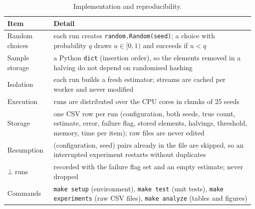 \documentclass[11pt]{article}
\begin{document}
\begin{table}[htbp]
\centering\small
\caption{Implementation and reproducibility.}\label{tab:impl}
\begin{tabularx}{\linewidth}{@{}p{2.8cm}L@{}}
\toprule
Item & Detail \\
\midrule
Random choices & each run creates \texttt{random.Random(seed)}; a choice with
  probability $q$ draws $u \in [0,1)$ and succeeds if $u < q$ \\
Sample storage & a Python \texttt{dict} (insertion order), so the elements
  removed in a halving do not depend on randomised hashing \\
Isolation & each run builds a fresh estimator; streams are cached per worker
  and never modified \\
Execution & runs are distributed over the CPU cores in chunks of 25 seeds \\
Storage & one CSV row per run (configuration, both seeds, true count,
  estimate, error, failure flag, stored elements, halvings, threshold, memory,
  time per item); raw files are never edited \\
Resumption & (configuration, seed) pairs already in the file are skipped, so
  an interrupted experiment restarts without duplicates \\
$\bot$ runs & recorded with the failure flag set and an empty estimate; never
  dropped \\
Commands & \texttt{make setup} (environment), \texttt{make test} (unit tests),
  \texttt{make experiments} (raw CSV files), \texttt{make analyze} (tables and
  figures) \\
\bottomrule
\end{tabularx}
\end{table}
\end{document}
